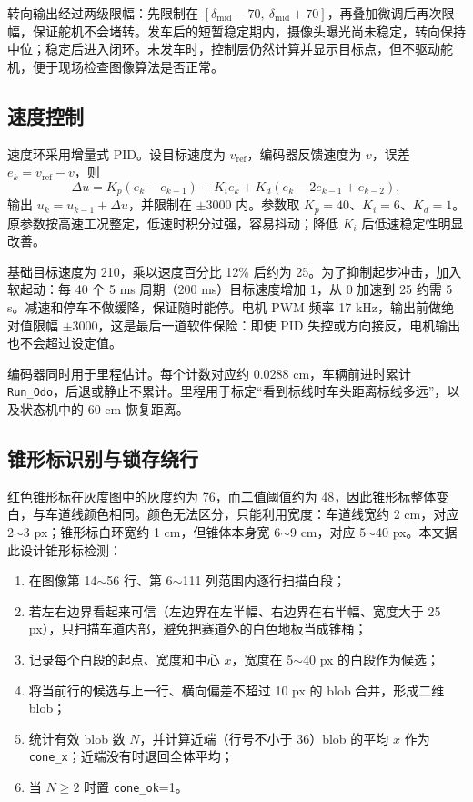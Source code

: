\documentclass{MaiTechReport}
\begin{document}
转向输出经过两级限幅：先限制在 $[\delta_{\mathrm{mid}}-70,\ \delta_{\mathrm{mid}}+70]$，再叠加微调后再次限幅，保证舵机不会堵转。发车后的短暂稳定期内，摄像头曝光尚未稳定，转向保持中位；稳定后进入闭环。未发车时，控制层仍然计算并显示目标点，但不驱动舵机，便于现场检查图像算法是否正常。

\subsection{速度控制}
速度环采用增量式 PID。设目标速度为 $v_{\mathrm{ref}}$，编码器反馈速度为 $v$，误差 $e_k=v_{\mathrm{ref}}-v$，则
\begin{equation}
  \Delta u=K_p(e_k-e_{k-1})+K_i e_k+K_d(e_k-2e_{k-1}+e_{k-2}),
  \label{eq:pid}
\end{equation}
输出 $u_k=u_{k-1}+\Delta u$，并限制在 $\pm3000$ 内。参数取 $K_p=40$、$K_i=6$、$K_d=1$。原参数按高速工况整定，低速时积分过强，容易抖动；降低 $K_i$ 后低速稳定性明显改善。

基础目标速度为 210，乘以速度百分比 12\% 后约为 25。为了抑制起步冲击，加入软起动：每 40 个 5 ms 周期（200 ms）目标速度增加 1，从 0 加速到 25 约需 5 s。减速和停车不做缓降，保证随时能停。电机 PWM 频率 17 kHz，输出前做绝对值限幅 $\pm3000$，这是最后一道软件保险：即使 PID 失控或方向接反，电机输出也不会超过设定值。

编码器同时用于里程估计。每个计数对应约 0.0288 cm，车辆前进时累计 \texttt{Run\_Odo}，后退或静止不累计。里程用于标定“看到标线时车头距离标线多远”，以及状态机中的 60 cm 恢复距离。

\subsection{锥形标识别与锁存绕行}
红色锥形标在灰度图中的灰度约为 76，而二值阈值约为 48，因此锥形标整体变白，与车道线颜色相同。颜色无法区分，只能利用宽度：车道线宽约 2 cm，对应 2$\sim$3 px；锥形标白环宽约 1 cm，但锥体本身宽 6$\sim$9 cm，对应 5$\sim$40 px。本文据此设计锥形标检测：

\begin{enumerate}
  \item 在图像第 14$\sim$56 行、第 6$\sim$111 列范围内逐行扫描白段；
  \item 若左右边界看起来可信（左边界在左半幅、右边界在右半幅、宽度大于 25 px），只扫描车道内部，避免把赛道外的白色地板当成锥桶；
  \item 记录每个白段的起点、宽度和中心 $x$，宽度在 5$\sim$40 px 的白段作为候选；
  \item 将当前行的候选与上一行、横向偏差不超过 10 px 的 blob 合并，形成二维 blob；
  \item 统计有效 blob 数 $N$，并计算近端（行号不小于 36）blob 的平均 $x$ 作为 \texttt{cone\_x}；近端没有时退回全体平均；
  \item 当 $N\ge2$ 时置 \texttt{cone\_ok}=1。
\end{enumerate}
\end{document}
